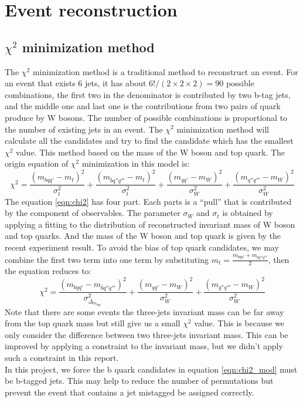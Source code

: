 \section{Event reconstruction}\label{sec:Event reconstruction}
\subsection{$\chi^{2}$ minimization method}\label{subsec:chi-square}
The $\chi^{2}$ minimization method is a traditional method to reconstruct an event. For an event that exists 6 jets, it has about $6!/(2\times2\times2)=90$ possible combinations, the first two in the denominator is contributed by two b-tag jets, and the middle one and last one is the contributions from two pairs of quark produce by W bosons. The number of possible combinations is proportional to the number of existing jets in an event. The $\chi^{2}$ minimization method will calculate all the candidates and try to find the candidate which has the smallest $\chi^{2}$ value. This method based on the mass of the W boson and top quark. The origin equation of $\chi^{2}$ minimization in this model is:
\begin{equation}\label{eqn:chi2}
	\chi^{2} = \frac{( m_{bqq'} - m_{t} )^{2}}{\sigma_{t}^{2}} + \frac{( m_{\bar{b}q''q'''} - m_{t} )^{2}}{\sigma_{t}^{2}} + \frac{(m_{qq'} - m_{W})^{2}}{\sigma^{2}_{W}} + \frac{(m _{q''q'''} - m_{W})^{2}}{\sigma^{2}_{W}}
\end{equation} 
The equation \ref{eqn:chi2} has four part. Each parts is a ``pull'' that is contributed by the component of observables. The parameter $\sigma_{W}$ and $\sigma_{t}$ is obtained by applying a fitting to the distribution of reconstructed invariant mass of W boson and top quarks. And the mass of the W boson and top quark is given by the recent experiment result. To avoid the bias of top quark candidates, we may combine the first two term into one term by substituting $m_{t}=\frac{m_{bqq'} + m_{\bar{b}q''q'''}}{2}$, then the equation reduces to: 
\begin{equation}\label{eqn:chi2_mod}
	\chi^{2} = \frac{(m_{bqq'} - m_{\bar{b}q''q'''})^{2}}{\sigma^{2}_{\Delta_{m_{bqq'}}}}  + \frac{(m_{qq'} - m_{W})^{2}}{\sigma^{2}_{W}} + \frac{(m _{q''q'''} - m_{W})^{2}}{\sigma^{2}_{W}}
\end{equation} 
Note that there are some events the three-jets invariant mass can be far away from the top quark mass but still give us a small $\chi^{2}$ value. This is because we only consider the difference between two three-jets invariant mass. This can be improved by applying a constraint to the invariant mass\cite{Mccarthy:2015ucy}, but we didn't apply such a constraint in this report. 
\\
In this project, we force the b quark candidates in equation \ref{eqn:chi2_mod} must be b-tagged jets. This may help to reduce the number of permutations but prevent the event that contains a jet mistagged be assigned correctly.
